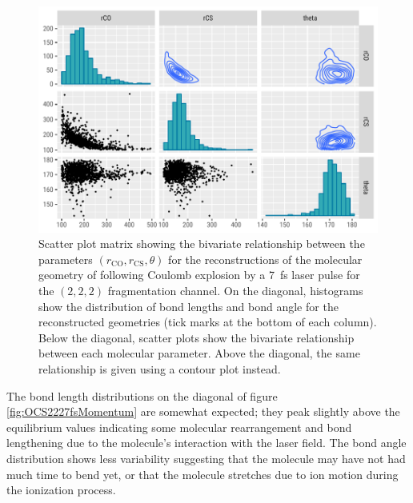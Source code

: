 \begin{figure}
  \centering
  \includegraphics[width=\textwidth]{Plots/OCS2227fsMOGeometryPairs}
  \caption[Scatter plot matrix showing the bivariate relationship between the parameters $(r_\mathrm{CO}, r_\mathrm{CS}, \theta)$ for the reconstructions of the molecular geometry of  following Coulomb explosion by a \SI{7}{\fs} laser pulse for the $(2,2,2)$ fragmentation channel.]
  {Scatter plot matrix showing the bivariate relationship between the parameters $(r_\mathrm{CO}, r_\mathrm{CS}, \theta)$ for the reconstructions of the molecular geometry of  following Coulomb explosion by a \SI{7}{\fs} laser pulse for the $(2,2,2)$ fragmentation channel. On the diagonal, histograms show the distribution of bond lengths and bond angle for the reconstructed geometries (tick marks at the bottom of each column). Below the diagonal, scatter plots show the bivariate relationship between each molecular parameter. Above the diagonal, the same relationship is given using a contour plot instead.}
  \label{fig:OCS2227fsMOGeometryPairs}
\end{figure}

The bond length distributions on the diagonal of figure \ref{fig:OCS2227fsMomentum} are somewhat expected; they peak slightly above the equilibrium values indicating some molecular rearrangement and bond lengthening due to the molecule's interaction with the laser field. The bond angle distribution shows less variability suggesting that the molecule may have not had much time to bend yet, or that the molecule stretches due to ion motion during the ionization process.


